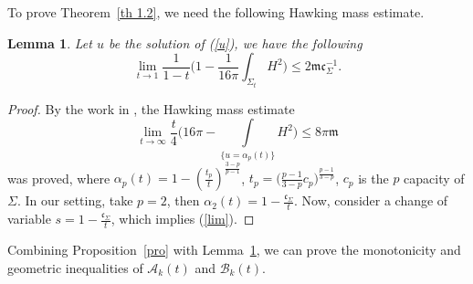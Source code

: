 \documentclass[12pt]{article}
\theoremstyle{definition}
\theoremstyle{plain}
\newtheorem{lemma}{Lemma}[section]
\numberwithin{equation}{section}
\begin{document}
To prove Theorem~\ref{th 1.2}, we need the following Hawking mass estimate.
\begin{lemma}\label{mass estimate}
	Let $ u $ be the solution of (\ref{u}), we have the following
\begin{equation}\label{lim}
	\lim\limits_{t\to 1}\frac{1}{1-t}\Big(1-\frac{1}{16\pi}\int_{\Sigma_{t}}H^{2}\Big)\leq 2\mathfrak{m}\mathfrak{c}_{\Sigma}^{-1}.
\end{equation}
\end{lemma}
\begin{proof}
By the work in \cite{Ag2}, the Hawking mass estimate 
$$
\lim\limits_{t\to \infty}\frac{t}{4}\Big(16\pi-\int\limits_{\{u=\alpha_{p}(t)\}}H^{2}\Big)\leq 8\pi \mathfrak{m}
$$
was proved, where $ \alpha_{p}(t)=1-(\frac{t_{p}}{t})^{\frac{3-p}{p-1}} $, $ t_{p}=\Big(\frac{p-1}{3-p}c_{p}\Big)^{\frac{p-1}{3-p}} $, $ c_{p} $ is the $ p $ capacity of $ \Sigma $. In our setting, take $ p=2 $, then $ \alpha_{2}(t)=1-\frac{\mathfrak{c}_{\Sigma}}{t} $. Now, consider a change of variable $ s=1-\frac{\mathfrak{c}_{\Sigma}}{t} $, which implies (\ref{lim}). 
\end{proof}
Combining Proposition~\ref{pro} with Lemma~\ref{mass estimate}, we can prove the monotonicity and geometric inequalities of $ \mathcal{A}_{k}(t) $ and $ \mathcal{B}_{k}(t) $.
\end{document}
